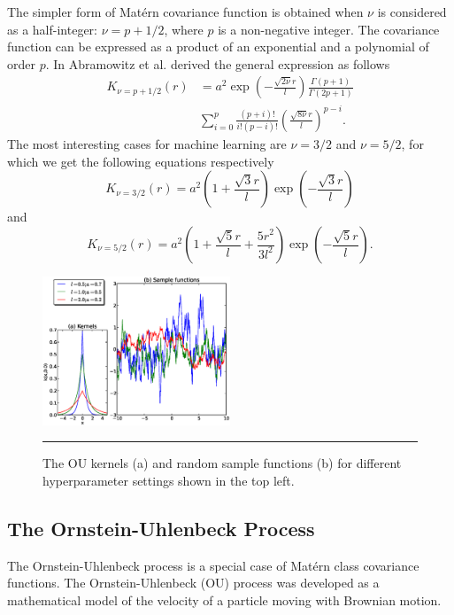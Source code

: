 The simpler form of Mat{\'e}rn covariance function is obtained when $\nu$ is considered as a  half-integer: $\nu = p+1/2$, where $p$ is a non-negative integer. The covariance function can be expressed as a product of an exponential and a polynomial of order $p$. In \cite{Abramowitz:1965} Abramowitz et al. derived the general expression as follows
\begin{equation} \label{eq:MaternGeneral}
\begin{split}
K_{\nu=p+1/2}(r)&= a^2\exp \left( - \frac{\sqrt{2\nu}r}{l}\right)\frac{\Gamma\left(p+1\right)}{\Gamma\left(2p+1\right)}\\
&\sum_{i=0}^{p}\frac{\left(p+i\right)!}{i!\left(p-i\right)!}
\left(\frac{\sqrt{8\nu}r}{l}\right)^{p-i}.
\end{split}
\end{equation}
The most interesting cases for machine learning are $\nu =3/2$ and $\nu=5/2$, for which we get the following equations respectively
\begin{equation} \label{eq:Matern32}
K_{\nu=3/2}(r)= a^2 \left(1+ \frac{\sqrt{3}r}{l} \right)\exp \left( - \frac{\sqrt{3}r}{l} \right)
\end{equation}
and
\begin{equation} \label{eq:Matern52}
K_{\nu=5/2}(r)= a^2 \left(1+ \frac{\sqrt{5}r}{l} + \frac{5r^2}{3l^2} \right)
\exp \left( - \frac{\sqrt{5}r}{l} \right).
\end{equation}

\begin{figure}[!htbp]
	\centering
	\includegraphics[width=0.5\textwidth,keepaspectratio]{diagrams/OU_cov.eps}
	\rule{25em}{0.5pt}
	\caption[The OU kernels and random sample functions]
	{The OU kernels (a) and random sample functions (b) for different hyperparameter settings shown in the top left.}
	\label{fig:OU_covariance}
\end{figure}

\subsection{The Ornstein-Uhlenbeck Process}
The Ornstein-Uhlenbeck process \cite{Ornstein_Uhlenbeck:1930} is a special case of Mat{\'e}rn class covariance functions. The Ornstein-Uhlenbeck (OU) process was developed as a mathematical model of the velocity of a particle moving with Brownian motion.

